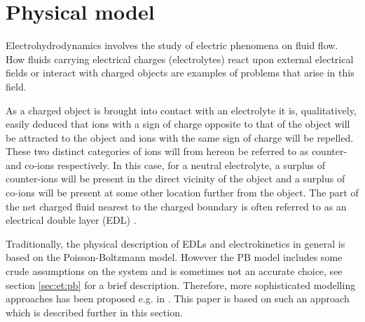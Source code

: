 \section{Physical model}\label{sec:pm}

Electrohydrodynamics involves the study of electric phenomena on fluid
flow. How fluids carrying electrical charges (electrolytes) react upon
external electrical fields or interact with charged objects are
examples of problems that arise in this field. 

As a charged object is brought into contact with an electrolyte it is,
qualitatively, easily deduced that ions with a sign of charge opposite
to that of the object will be attracted to the object and ions with
the same sign of charge will be repelled. These two distinct
categories of ions will from hereon be referred to as counter- and
co-ions respectively. In this case, for a neutral electrolyte, a
surplus of counter-ions will be present in the direct vicinity of the
object and a surplus of co-ions will be present at some other location
further from the object. The part of the net charged fluid nearest to
the charged boundary is often referred to as an electrical double
layer (EDL) \cite{dongquing-ren-book}. 

Traditionally, the physical description of EDLs and electrokinetics in
general is based on the Poisson-Boltzmann model. However the PB model
includes some crude assumptions on the system and is sometimes not an
accurate choice, see section \ref{sec:et:pb} for a brief
description. Therefore, more sophisticated modelling approaches has
been proposed e.g. in \cite{}. This paper is based on such an approach
which is described further in this section.

















